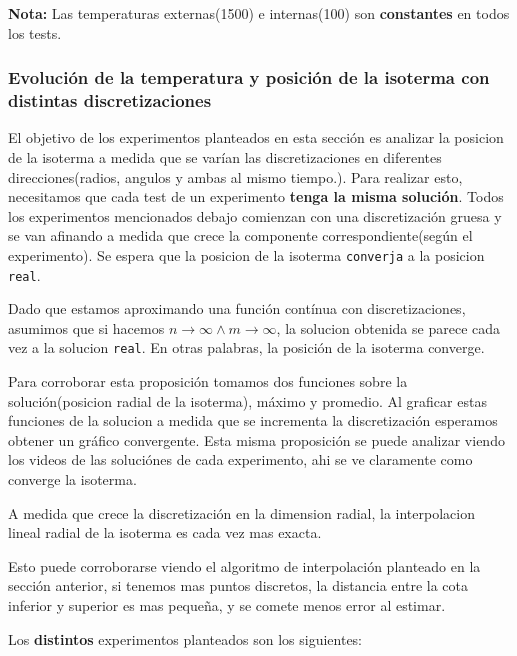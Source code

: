 \textbf{Nota: } Las temperaturas externas(1500) e internas(100) son \textbf{constantes} en todos los tests. 

\subsubsection{Evolución de la temperatura y posición de la isoterma con distintas discretizaciones}

El objetivo de los experimentos planteados en esta sección es analizar la posicion de la isoterma a medida que se varían las discretizaciones en diferentes direcciones(radios, angulos y ambas al mismo tiempo.). Para realizar esto, necesitamos que cada test de un experimento \textbf{tenga la misma solución}. Todos los experimentos mencionados debajo comienzan con una discretización gruesa y se van afinando a medida que crece la componente correspondiente(según el experimento). Se espera que la posicion de la isoterma \texttt{converja} a la posicion \texttt{real}.

\begin{proposition} Dado que estamos aproximando una función contínua con discretizaciones, asumimos que si hacemos $n \to\infty \land m\to\infty$, la solucion obtenida se parece cada vez a la solucion \texttt{real}. En otras palabras, la posición de la isoterma converge.
\end{proposition}

Para corroborar esta proposición tomamos dos funciones sobre la solución(posicion radial de la isoterma), máximo y promedio. Al graficar estas funciones de la solucion a medida que se incrementa la discretización esperamos obtener un gráfico convergente. Esta misma proposición se puede analizar viendo los videos de las soluciónes de cada experimento, ahi se ve claramente como converge la isoterma.

\begin{proposition} A medida que crece la discretización en la dimension radial, la interpolacion lineal radial de la isoterma es cada vez mas exacta.
\end{proposition}
Esto puede corroborarse viendo el algoritmo de interpolación planteado en la sección anterior, si tenemos mas puntos discretos, la distancia entre la cota inferior y superior es mas pequeña, y se comete menos error al estimar.

\vspace{0.3cm}

Los \textbf{distintos} experimentos planteados son los siguientes:

